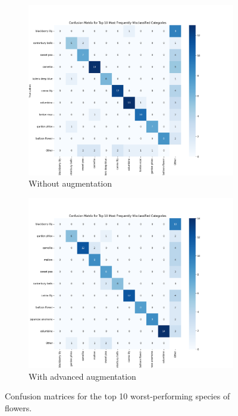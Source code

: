 \begin{figure}[!h]
    \centering
    \begin{subfigure}[b]{0.65\textwidth}
        \centering
        \includegraphics[width=\textwidth]{Images/flowers-results/confusion_matrix_no_aug.png}
        \caption{Without augmentation}
    \end{subfigure}

    \begin{subfigure}[b]{0.65\textwidth}
        \centering
        \includegraphics[width=\textwidth]{Images/flowers-results/confusion_matrix_adv_aug.png}
        \caption{With advanced augmentation}
    \end{subfigure}
    \caption{Confusion matrices for the top 10 worst-performing species of flowers.}
    \label{fig:confMatricesFlowersEfficient}
\end{figure}

